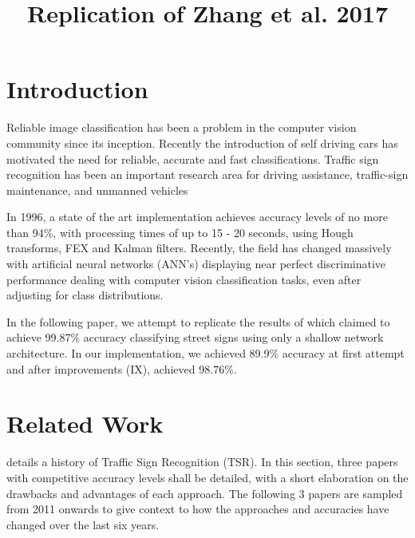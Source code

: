 \documentclass[conference]{IEEEtran}
\begin{document}
\title{Replication of Zhang et al. 2017 \cite{ZhangsMainPaper}}
\author{
\and
{}
}

\maketitle

\IEEEpeerreviewmaketitle

\section{Introduction}

Reliable image classification has been a problem in the computer vision community since its inception. Recently the introduction of self driving cars has motivated the need for  reliable, accurate and fast classifications. Traffic sign recognition has been an important research area for driving assistance, traffic-sign maintenance, and unmanned vehicles \linebreak

In 1996, a state of the art implementation \cite{Old2003Paper} achieves accuracy levels of no more than 94\%, with processing times of up to 15 - 20 seconds, using Hough transforms, FEX and Kalman filters. Recently, the field has changed massively with artificial neural networks (ANN's) displaying near perfect discriminative performance dealing with computer vision classification tasks, even after adjusting for class distributions. \linebreak

In the following paper, we attempt to replicate the results of \cite{ZhangsMainPaper} which claimed to achieve 99.87\% accuracy classifying street signs using only a shallow network architecture. In our implementation, we achieved 89.9\% accuracy at first attempt and after improvements (IX), achieved 98.76\%.

\section{Related Work}

\cite{ZhangsMainPaper} details a history of Traffic Sign Recognition (TSR). In this section, three papers with competitive accuracy levels shall be detailed, with a short elaboration on the drawbacks and advantages of each approach. The following 3 papers are sampled from 2011 onwards to give context to how the approaches and accuracies have changed over the last six years. \linebreak
\end{document}

